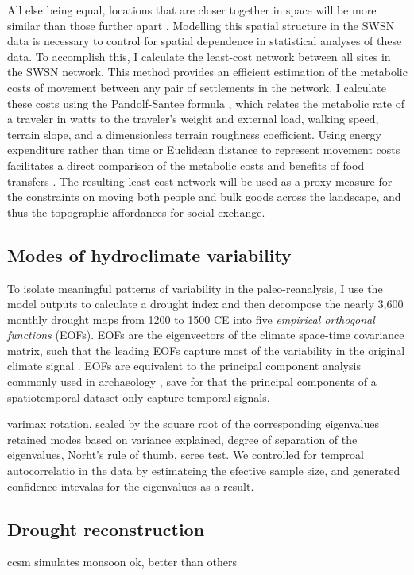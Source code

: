 \documentclass[fleqn,10pt]{wlscirep}
\begin{document}
All else being equal, locations that are closer together in space will be more similar than those further apart \cite{Tobler1970}. Modelling this spatial structure in the SWSN data is necessary to control for spatial dependence in statistical analyses of these data. To accomplish this, I calculate the least-cost network between all sites in the SWSN network. This method provides an efficient estimation of the metabolic costs of movement between any pair of settlements in the network. I calculate these costs using the Pandolf-Santee formula \cite{White2012}, which relates the metabolic rate of a traveler in watts to the traveler's weight and external load, walking speed, terrain slope, and a dimensionless terrain roughness coefficient. Using energy expenditure rather than time or Euclidean distance to represent movement costs facilitates a direct comparison of the metabolic costs and benefits of food transfers  \cite{Drennan1984}. The resulting least-cost network will be used as a proxy measure for the constraints on moving both people and bulk goods across the landscape, and thus the topographic affordances for social exchange.



\subsection*{Modes of hydroclimate variability}
To isolate meaningful patterns of variability in the paleo-reanalysis, I use the model outputs to calculate a drought index and then decompose the nearly 3,600 monthly drought maps from 1200 to 1500 CE into five \textit{empirical orthogonal functions} (EOFs). EOFs are the eigenvectors of the climate space-time covariance matrix, such that the leading EOFs capture most of the variability in the original climate signal \cite{Lorenz1956EmpiricalPrediction}. EOFs are equivalent to the principal component analysis commonly used in archaeology \cite[e.g.]{Dean1996DemographyStress}, save for that the principal components of a spatiotemporal dataset only capture temporal signals.

varimax rotation, scaled by the square root of the corresponding eigenvalues
retained modes based on variance explained, degree of separation of the eigenvalues, Norht's rule of thumb, scree test. We controlled for temproal autocorrelatio in the data by estimateing the efective sample size, and generated confidence intevalas for the eigenvalues as a result.

\subsection*{Drought reconstruction}
ccsm simulates monsoon ok, better than others
\end{document}
